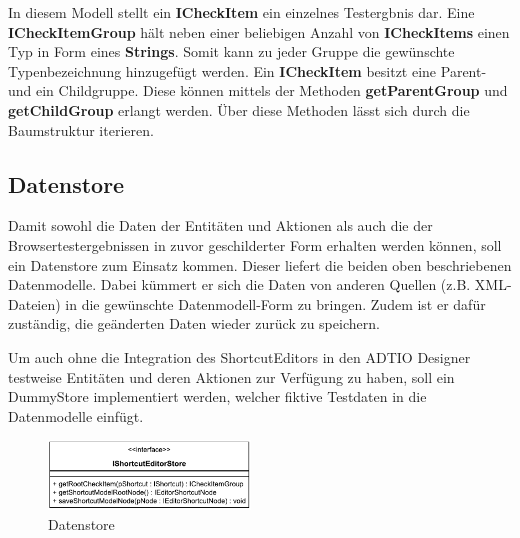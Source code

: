 In diesem Modell stellt ein \textbf{ICheckItem} ein einzelnes Testergbnis dar. Eine \textbf{ICheckItemGroup} hält neben einer beliebigen Anzahl von \textbf{ICheckItems} einen Typ in Form eines \textbf{Strings}. Somit kann zu jeder Gruppe die gewünschte Typenbezeichnung hinzugefügt werden. Ein \textbf{ICheckItem} besitzt eine Parent- und ein Childgruppe. Diese können mittels der Methoden \textbf{getParentGroup} und \textbf{getChildGroup} erlangt werden. Über diese Methoden lässt sich durch die Baumstruktur iterieren.

\vspace{-5px}

\subsection{Datenstore}

Damit sowohl die Daten der Entitäten und Aktionen als auch die der Browsertestergebnissen in zuvor geschilderter Form erhalten werden können, soll ein Datenstore zum Einsatz kommen. Dieser liefert die beiden oben beschriebenen Datenmodelle. Dabei kümmert er sich die Daten von anderen Quellen (z.B. XML-Dateien) in die gewünschte Datenmodell-Form zu bringen. Zudem ist er dafür zuständig, die geänderten Daten wieder zurück zu speichern.

Um auch ohne die Integration des ShortcutEditors in den ADTIO Designer testweise Entitäten und deren Aktionen zur Verfügung zu haben, soll ein DummyStore implementiert werden, welcher fiktive Testdaten in die Datenmodelle einfügt.

\vfill

\begin{figure}[H]
	\centering
	\includegraphics[height=70px]{../graphic/diagrams/CD_IShortcutEditorStore/IShortcutEditorStore}
	\caption{Datenstore}
	\label{fig:ishortcuteditorstore}
\end{figure}



\newpage
